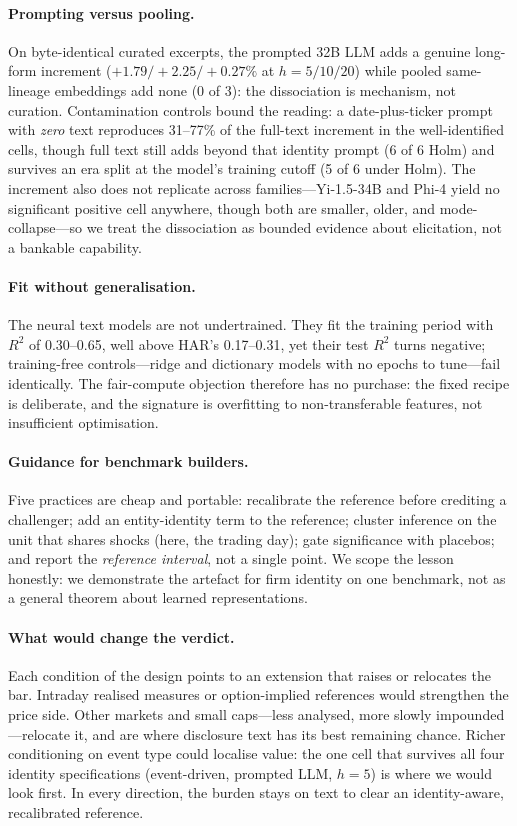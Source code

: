 \paragraph{Prompting versus pooling.}
On byte-identical curated excerpts, the prompted 32B LLM adds a genuine long-form increment ($+1.79/+2.25/+0.27\%$ at $h{=}5/10/20$) while pooled same-lineage embeddings add none (0 of 3): the dissociation is mechanism, not curation. Contamination controls bound the reading: a date-plus-ticker prompt with \emph{zero} text reproduces 31--77\% of the full-text increment in the well-identified cells, though full text still adds beyond that identity prompt (6 of 6 Holm) and survives an era split at the model's training cutoff (5 of 6 under Holm). The increment also does not replicate across families---Yi-1.5-34B and Phi-4 yield no significant positive cell anywhere, though both are smaller, older, and mode-collapse---so we treat the dissociation as bounded evidence about elicitation, not a bankable capability.

\paragraph{Fit without generalisation.}
The neural text models are not undertrained. They fit the training period with $R^2$ of 0.30--0.65, well above HAR's 0.17--0.31, yet their test $R^2$ turns negative; training-free controls---ridge and dictionary models with no epochs to tune---fail identically. The fair-compute objection therefore has no purchase: the fixed recipe is deliberate, and the signature is overfitting to non-transferable features, not insufficient optimisation.

\paragraph{Guidance for benchmark builders.}
Five practices are cheap and portable: recalibrate the reference before crediting a challenger; add an entity-identity term to the reference; cluster inference on the unit that shares shocks (here, the trading day); gate significance with placebos; and report the \emph{reference interval}, not a single point. We scope the lesson honestly: we demonstrate the artefact for firm identity on one benchmark, not as a general theorem about learned representations.

\paragraph{What would change the verdict.}
Each condition of the design points to an extension that raises or relocates the bar. Intraday realised measures \citep{andersen2003modeling} or option-implied references \citep{blair2001forecasting} would strengthen the price side. Other markets and small caps---less analysed, more slowly impounded---relocate it, and are where disclosure text has its best remaining chance. Richer conditioning on event type could localise value: the one cell that survives all four identity specifications (event-driven, prompted LLM, $h{=}5$) is where we would look first. In every direction, the burden stays on text to clear an identity-aware, recalibrated reference.
